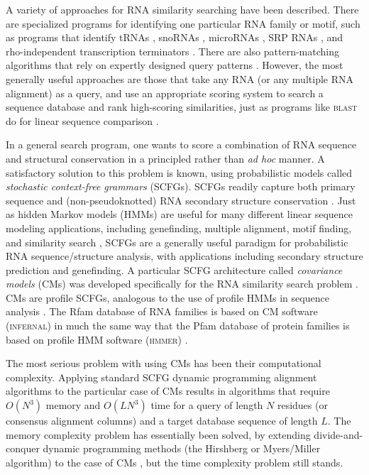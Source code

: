 \documentclass[11pt]{article}
\begin{document}
A variety of approaches for RNA similarity searching have been
described. There are specialized programs for identifying one
particular RNA family or motif, such as programs that identify tRNAs
\cite{LoweEddy97,Laslett04}, snoRNAs \cite{LoweEddy99,Schattner06},
microRNAs \cite{Lai03, Lim03}, SRP RNAs \cite{Regalia02}, and
rho-independent transcription terminators \cite{Ermolaeva00}. There
are also pattern-matching algorithms that rely on expertly designed
query patterns \cite{Macke01,Gautheret01}. However, the most generally
useful approaches are those that take any RNA (or any multiple RNA
alignment) as a query, and use an appropriate scoring system to search
a sequence database and rank high-scoring similarities, just as
programs like \textsc{blast} do for linear sequence comparison
\cite{Altschul97}.

In a general search program, one wants to score a
combination of RNA sequence and structural conservation in a
principled rather than \emph{ad hoc} manner. A satisfactory solution
to this problem is known, using probabilistic models called
\emph{stochastic context-free grammars} (SCFGs). SCFGs readily capture
both primary sequence and (non-pseudoknotted) RNA secondary structure
conservation \cite{Sakakibara94c,Durbin98}. Just as hidden Markov
models (HMMs) are useful for many different linear sequence modeling
applications, including genefinding, multiple alignment, motif
finding, and similarity search \cite{Durbin98}, SCFGs are a generally
useful paradigm for probabilistic RNA sequence/structure analysis,
with applications including secondary structure prediction and
genefinding. A particular SCFG architecture called \emph{covariance
models} (CMs) was developed specifically for the RNA similarity search
problem \cite{Eddy94}.  CMs are profile SCFGs, analogous to the use of
profile HMMs in sequence analysis \cite{Eddy94,Eddy02b}.  The Rfam
database of RNA families \cite{Griffiths-Jones05} is based on CM
software (\textsc{infernal}) in much the same way that the Pfam
database of protein families is based on profile HMM software
(\textsc{hmmer}) \cite{Sonnhammer98,Finn06}.

The most serious problem with using CMs has been their computational
complexity. Applying standard SCFG dynamic programming alignment
algorithms to the particular case of CMs results in algorithms that
require $O(N^3)$ memory and $O(L N^3)$ time for a query of length $N$
residues (or consensus alignment columns) and a target database
sequence of length $L$.  The memory complexity problem has essentially
been solved, by extending divide-and-conquer dynamic programming
methods (the Hirshberg or Myers/Miller algorithm) to the case of CMs
\cite{Eddy02b}, but the time complexity problem still stands.
\end{document}
